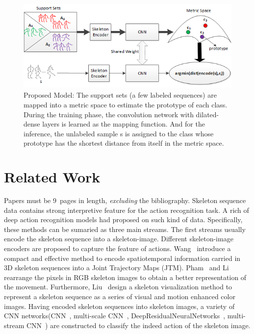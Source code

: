 \documentclass{bmvc2k}
\begin{document}
\begin{figure}[htb] 
	\centering
	\includegraphics[height=1.8in]{images/Figure_1.png}
	\caption{Proposed Model: The support sets (a few labeled sequences) are mapped into a metric space to estimate the prototype of each class. During the training phase, the convolution network with dilated-dense layers is learned as the mapping function. And for the inference, the unlabeled sample s is assigned to the class whose prototype has the shortest distance from itself in the metric space.}
	\label{fig:1}	
\end{figure}
\section{Related Work}
Papers must be 9~pages in length, {\em excluding} the bibliography.
Skeleton sequence data contains strong interpretive feature for the action recognition task. A rich of deep action recognition models had proposed on such kind of data. Specifically, these methods can be sumaried as three main streams. 
The first streams usually encode the skeleton sequence into a skeleton-image. Different skeleton-image encoders are proposed to capture the feature of actions. Wang~\cite{wang2016action} introduce a compact and effective method to encode spatiotemporal information carried in 3D skeleton sequences into a Joint Trajectory Maps (JTM). Pham~\cite{pham2017learning} and Li~\cite{li2017skeleton} rearrange the pixels in RGB skeleton images to obtain a better representation of the movement. Furthermore, Liu~\cite{liu2017enhanced} design a skeleton visualization method to represent a skeleton sequence as a series of visual and motion enhanced color images. Having encoded skeleton sequences into skeleton images, a variety of CNN networks(CNN~\cite{wang2016action}, multi-scale CNN~\cite{li2017skeleton_2}, DeepResidualNeuralNetworks~\cite{pham2017learning}, multi-stream CNN~\cite{liu2017enhanced}) are constructed to classify the indeed action of the skeleton image. 
\end{document}
